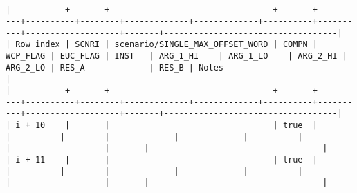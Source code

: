 \documentclass[varwidth=\maxdimen,margin=0.5cm,multi={verbatim}]{standalone}
\begin{document}
\begin{verbatim}


|-----------+-------+---------------------------------+-------+----------+----------+--------+-------------+-------------+----------+----------+-------------------+-------+-----------------------------------|
| Row index | SCNRI | scenario/SINGLE_MAX_OFFSET_WORD | COMPN | WCP_FLAG | EUC_FLAG | INST   | ARG_1_HI    | ARG_1_LO    | ARG_2_HI | ARG_2_LO | RES_A             | RES_B | Notes                             |
|-----------+-------+---------------------------------+-------+----------+----------+--------+-------------+-------------+----------+----------+-------------------+-------+-----------------------------------|
| i + 10    |       |                                 | true  |          |          |        |             |             |          |          |                   |       |                                   |
| i + 11    |       |                                 | true  |          |          |        |             |             |          |          |                   |       |                                   |

\end{verbatim}
\end{document}
